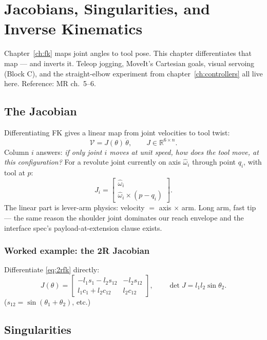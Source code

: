 \chapter{Jacobians, Singularities, and Inverse Kinematics}
\label{ch:jac}

Chapter~\ref{ch:fk} maps joint angles to tool pose. This chapter differentiates that map ---
and inverts it. Teleop jogging, MoveIt's Cartesian goals, visual servoing (Block C), and the
straight-elbow experiment from chapter~\ref{ch:controllers} all live here. Reference: MR
ch.~5--6.

\section{The Jacobian}

Differentiating FK gives a linear map from joint velocities to tool twist:
\begin{equation}
  \mathcal V = J(\theta)\,\dot\theta, \qquad J \in \mathbb R^{6\times n}.
\end{equation}
Column $i$ answers: \emph{if only joint $i$ moves at unit speed, how does the tool move, at
this configuration?} For a revolute joint currently on axis $\hat\omega_i$ through point
$q_i$, with tool at $p$:
\[
  J_i = \begin{bmatrix} \hat\omega_i \\ \hat\omega_i \times (p - q_i) \end{bmatrix}.
\]
The linear part is lever-arm physics: velocity $=$ axis $\times$ arm. Long arm, fast tip ---
the same reason the shoulder joint dominates our reach envelope and the interface spec's
payload-at-extension clause exists.

\subsection{Worked example: the 2R Jacobian}

Differentiate \eqref{eq:2rfk} directly:
\begin{equation}
  J(\theta) = \begin{bmatrix}
    -l_1 s_1 - l_2 s_{12} & -l_2 s_{12} \\
     l_1 c_1 + l_2 c_{12} &  l_2 c_{12}
  \end{bmatrix},
  \qquad \det J = l_1 l_2 \sin\theta_2 .
  \label{eq:2rjac}
\end{equation}
($s_{12} = \sin(\theta_1{+}\theta_2)$, etc.)

\section{Singularities}


